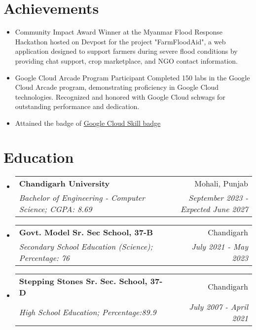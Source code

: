 \documentclass[apaper,20pt]{article}
\makeatletter
\newcommand{\MYhref}[3][primaryColor]{\href{#2}{{\color{#1}#3}}}
\newcommand{\resumeSubheading}[4]{
  \vspace{-1pt}\item
    \begin{tabular*}{0.97\textwidth}{l@{\extracolsep{\fill}}r}
      \textbf{#1} & #2 \\
      \textit{#3} & \textit{#4} \\
    \end{tabular*}\vspace{-5pt}
}
\newcommand{\resumeSubHeadingListStart}{\begin{itemize}[leftmargin=*]}
\newcommand{\resumeSubHeadingListEnd}{\end{itemize}}
\makeatother
\begin{document}
\section{Achievements}
\vspace{6pt}
\begin{itemize}[labelsep=*,label=$\circ$,leftmargin=0.9pc]
\item {Community Impact Award Winner at the Myanmar Flood Response Hackathon hosted on Devpost for the project "FarmFloodAid", a web application designed to support farmers during severe flood conditions by providing chat support, crop marketplace, and NGO contact information.}

\vspace{-0pt}
	\item {Google Cloud Arcade Program Participant
Completed 150 labs in the Google Cloud Arcade program, demonstrating proficiency in Google Cloud technologies.
Recognized and honored with Google Cloud schwags for outstanding performance and dedication.}

\vspace{-0pt}

	\item {Attained the badge of {\MYhref{https://www.cloudskillsboost.google/public_profiles/158ff43d-244d-49d7-9269-b6014d626472}{Google Cloud Skill badge}}}
\end{itemize}


\vspace{-6pt}

\section{Education}
\vspace{6pt}

\resumeSubHeadingListStart
\resumeSubheading
{Chandigarh University}{Mohali, Punjab}
{Bachelor of Engineering - Computer Science;  CGPA: 8.69}{September 2023 - Expected June 2027}
\vspace{3pt}
\resumeSubheading
{Govt. Model Sr. Sec School, 37-B}{Chandigarh}
{Secondary School Education (Science);  Percentage: 76}{July 2021 - May 2023}
\vspace{3pt}
\resumeSubheading
{Stepping Stones Sr. Sec. School, 37-D}{Chandigarh}
{High School Education;  Percentage:89.9 }{July 2007 - April 2021}
\resumeSubHeadingListEnd
\end{document}
